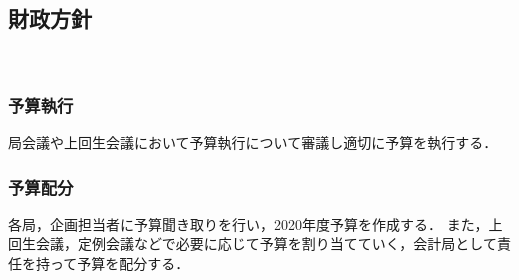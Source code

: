 \subsection*{財政方針}
​
​
\subsubsection*{予算執行}
局会議や上回生会議において予算執行について審議し適切に予算を執行する．
\subsubsection*{予算配分}
各局，企画担当者に予算聞き取りを行い，2020年度予算を作成する．
また，上回生会議，定例会議などで必要に応じて予算を割り当てていく，会計局として責任を持って予算を配分する．
